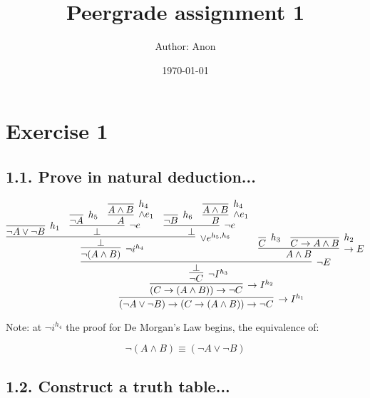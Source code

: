 \documentclass[a4paper,11pt]{article}
\title{Peergrade assignment 1}
\author{Author: Anon}
\date{\today}
\begin{document}
 

\maketitle

\section*{Exercise 1}

\subsection*{1.1. Prove in natural deduction...}

$$
\infer[ \to I^{h_1} ]{ (\neg A \lor \neg B) \to (C \to (A \land B)) \to \neg C }{
    \infer[ \to I^{h_2} ]{ (C \to (A \land B)) \to \neg C }{
        \infer[ \neg I^{h_3} ]{ \neg C }{
            \infer[\neg E]{ \bot }{
                \infer[\neg i^{h_4}]{ \neg ( A \land B) }{
                    \infer[ \lor e^{h_5 , h_6} ]{\bot}{
                        \infer[h_1]{\neg A \lor \neg B}{}
                        &
                        \infer[\neg e]{\bot}{
                            \infer[h_5]{\neg A}{}
                            &
                            \infer[\land e_1]{A}{
                                \infer[h_4]{A \land B}{}
                            }
                        }
                        &
                        \infer[\neg e]{\bot}{
                            \infer[h_6]{\neg B}{}
                            &
                            \infer[\land e_1]{B}{
                                \infer[h_4]{A \land B}{}
                            }
                        }
                    }
                }
                &
                \infer[\to E]{A \land B}{
                    \infer[h_3]{C}{}
                    &
                    \infer[h_2]{C \to A \land B}{}
                }
            }
        }
    }
}
$$

Note: at $\neg i^{h_4}$ the proof for De Morgan's Law begins, the equivalence of:

$$\neg(A \land B) \equiv (\neg A \lor \neg B) $$

\subsection*{1.2. Construct a truth table...}
\end{document}
